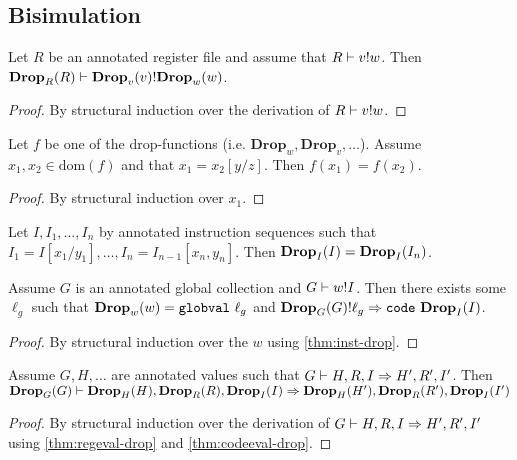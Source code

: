 \subsection{Bisimulation}

\begin{lemma}
  \label{thm:regeval-drop}
  Let $R$ be an annotated register file and assume that
  ${R} |- {v} ! {w}$. Then ${\mathbf{Drop}_{{R}}({R})} |- {\mathbf{Drop}_{{v}}({v})} ! {\mathbf{Drop}_{{w}}({w})}$.
\end{lemma}
\begin{proof}
  By structural induction over the derivation of ${R} |- {v} ! {w}$.
\end{proof}

\begin{lemma}
  Let $f$ be one of the drop-functions (i.e.
  $\mathbf{Drop}_w, \mathbf{Drop}_v, \dots$). Assume
  $x_1, x_2 \in \mathrm{dom}(f)$ and that $x_1 = x_2[y / z]$. Then
  $f(x_1) = f(x_2)$.
\end{lemma}
\begin{proof}
  By structural induction over $x_1$.
\end{proof}

\begin{corollary}
  \label{thm:inst-drop}
  Let $I, I_1, \dots, I_n$ by annotated instruction sequences such that
  $I_1 = I[x_1 / y_1], \dots, I_n = I_{n-1}[x_n, y_n]$. Then
  $\mathbf{Drop}_{{I}}({I}) = \mathbf{Drop}_{{I}}({I_n})$.
\end{corollary}

\begin{lemma}
  \label{thm:codeeval-drop}
  Assume $G$ is an annotated global collection and ${G} |- {w} ! {I}$. Then
  there exists some $\ell_g$ such that $\drop{w}{w} = \mathtt{globval}\ \ell_g$
  and $\lookup{\drop{G}{G}}{\ell_g}{\mathtt{code}\ \drop{I}{I}}$.
\end{lemma}
\begin{proof}
  By structural induction over the $w$ using \autoref{thm:inst-drop}.
\end{proof}

\begin{lemma}
  \label{thm:exec-drop}
  Assume $G, H, \dots$ are annotated values such that
  ${G} |- {H, R, I} => {H', R', I'}$. Then
  ${\mathbf{Drop}_{{G}}({G})} |- {\mathbf{Drop}_{{H}}({H}), \mathbf{Drop}_{{R}}({R}),
    \mathbf{Drop}_{{I}}({I})} => {\mathbf{Drop}_{{H}}({H'}), \mathbf{Drop}_{{R}}({R'}), \mathbf{Drop}_{{I}}({I'})}$
\end{lemma}
\begin{proof}
  By structural induction over the derivation of
  ${G} |- {H, R, I} => {H', R', I'}$ using \autoref{thm:regeval-drop}
  and \autoref{thm:codeeval-drop}.
\end{proof}

